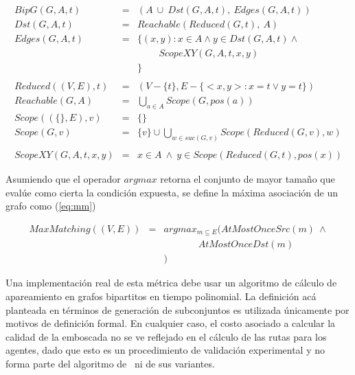 \begin{small}
\begin{eqnarray}
BipG(G,A,t) & = & 
  (A\ \cup\ Dst(G,A,t),\ Edges(G,A,t)) \label{eq:bipgraph}\\
Dst(G,A,t) & = & Reachable(Reduced(G,t),\ A)\label{eq:bipgraphdst} \\
Edges(G,A,t) & = & \{ (x,y) : x \in A \wedge y \in Dst(G,A,t) \wedge\ \nonumber\\
& & \hspace{27pt} ScopeXY(G,A,t,x,y)\nonumber\\
& & \} \label{eq:bipgraphedges}\\
\nonumber\\
Reduced((V,E), t) & = & (V-\{t\}, E - \{<x,y>: x = t  \vee y = t\})\nonumber\\
Reachable(G,A) &=& \bigcup_{a \in A} Scope(G, pos(a))\nonumber\\
Scope((\{\},E), v) & = & \{\}\nonumber\\
Scope(G, v) & = & \{v\} \cup \bigcup_{w \in suc(G,v)}Scope(Reduced(G,v),w)\nonumber\\
\nonumber\\
ScopeXY(G,A,t,x,y) &=& x \in A \ \wedge\ y \in Scope(Reduced(G,t),pos(x))\nonumber
\end{eqnarray}
\end{small}

\noindent
Asumiendo que el operador $argmax$ retorna el conjunto de mayor
tamaño que eval\'ue como cierta la condici\'on expuesta, se define
la m\'axima asociaci\'on de un grafo como (\ref{eq:mm})

\begin{small}
\begin{eqnarray}
MaxMatching((V,E)) & = & argmax_{m \subseteq E}( AtMostOnceSrc(m)\ \wedge\nonumber\\
				   &   & \hspace{43pt}AtMostOnceDst(m)\nonumber\\
				   &   & )
\label{eq:mm}
\end{eqnarray}
\end{small}

Una implementaci\'on real de esta m\'etrica debe usar un algoritmo de
c\'alculo de apareamiento en grafos bipartitos en tiempo polinomial\cite{Wes01}.
La definici\'on ac\'a planteada en t\'erminos de generaci\'on de subconjuntos
es utilizada \'unicamente por motivos de definici\'on formal. En cualquier caso,
el costo asociado a calcular la calidad de la emboscada no se ve reflejado en
el c\'alculo de las rutas para los agentes, dado que esto es un procedimiento
de validaci\'on experimental y no forma parte del algoritmo de \ambush\ ni de
sus va\-rian\-tes.